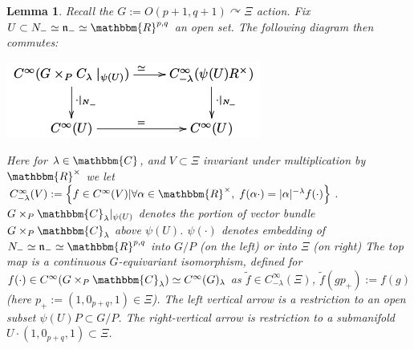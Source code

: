 \documentclass{article}
\newcommand{\assign}{:=}
\numberwithin{definition}{section}
\newtheorem{lemma}{Lemma}
\numberwithin{lemma}{section}
\numberwithin{proposition}{section}
{\theorembodyfont{\rmfamily}\newtheorem{remark}{Remark}
\numberwithin{remark}{section}
}
\begin{document}
\begin{lemma}
  \label{sol:lem-commdiag}Recall the $G \assign O ( p + 1, q + 1)
  \curvearrowright \Xi$ action. Fix $U \subset N_- \simeq \mathfrak{n}_-
  \simeq \mathbbm{R}^{p, q}$ an open set. The following diagram then commutes:
  
  \begin{center}
    \includegraphics[scale=0.6]{master_master-6.png}
  \end{center}
  
  Here for $\lambda \in \mathbbm{C}$, and $V \subset \Xi$ invariant under
  multiplication by $\mathbbm{R}^{\times}$ we let $C^{\infty}_{- \lambda} ( V)
  \assign \left\{ f \in C^{\infty} ( V) | \forall \alpha \in
  \mathbbm{R}^{\times}, \; f ( \alpha \cdot) = | \alpha |^{- \lambda} f (
  \cdot) \right\}$. $G \times_P \mathbbm{C}_{\lambda} |_{\psi ( U)}$ denotes
  the portion of vector bundle $G \times_P \mathbbm{C}_{\lambda}$ above $\psi
  ( U)$. $\psi ( \cdot)$ denotes embedding of $N_- \simeq \mathfrak{n}_-
  \simeq \mathbbm{R}^{p, q}$ into $G / P$ (on the left) or into $\Xi$ (on
  right) The top map is a continuous $G$-equivariant isomorphism, defined for
  $f ( \cdot) \in C^{\infty} ( G \times_P \mathbbm{C}_{\lambda}) \simeq
  C^{\infty} ( G)_{\lambda}$ as $\tilde{f} \in C^{\infty}_{- \lambda} ( \Xi)$,
  $\tilde{f} ( g p_+) \assign f ( g)$ (here $p_+ \assign ( 1, 0_{p + q}, 1)
  \in \Xi$). The left vertical arrow is a restriction to an open subset $\psi
  ( U) P \subset G / P$. The right-vertical arrow is restriction to a
  submanifold $U \cdot ( 1, 0_{p + q}, 1) \subset \Xi$.
\end{lemma}
\end{document}

